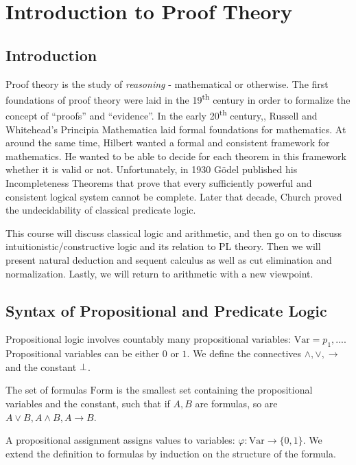 \section{Introduction to Proof Theory}

\subsection{Introduction}
Proof theory is the study of \emph{reasoning} - mathematical or otherwise.
The first foundations of proof theory were laid in the 19\textsuperscript{th}
century in order to formalize the concept of ``proofs'' and ``evidence''.
In the early 20\textsuperscript{th} century,, Russell and Whitehead's
Principia Mathematica laid formal foundations for mathematics. At around the same 
time, Hilbert wanted a formal and consistent framework for mathematics.
He wanted to be able to decide for each theorem in this framework whether
it is valid or not. Unfortunately, in 1930 G\"odel published his
Incompleteness Theorems that prove that every sufficiently powerful and consistent
logical system cannot be complete. Later that decade, Church proved the
undecidability of classical predicate logic.

This course will discuss classical logic and arithmetic, and then go on to discuss
intuitionistic/constructive logic and its relation to PL theory. Then we will
present natural deduction and sequent calculus as well as cut elimination
and normalization. Lastly, we will return to arithmetic with a new viewpoint.

\subsection{Syntax of Propositional and Predicate Logic}
Propositional logic involves countably many propositional variables: $\mathrm{Var} = {p_1, ...}$. 
Propositional variables can be either $0$ or $1$. We define the connectives $\wedge, \vee, \to$ 
and the constant $\perp$.

The set of formulas $\mathrm{Form}$ is the smallest set containing the propositional variables and 
the constant, such that if $A, B$ are formulas, so are $A \vee B, A \wedge B, A \to B$.

A propositional assignment assigns values to variables: $\varphi: \mathrm{Var} \to \{0, 1\}$.
We extend the definition to formulas by induction on the structure of the formula.

